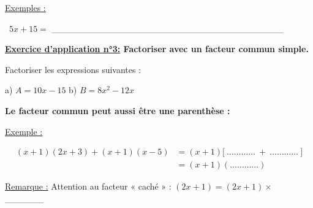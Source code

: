 \documentclass[12pt]{article}
\begin{document}
\vspace{5pt}
\underline{Exemples :}

\vspace{5pt}
\textbullet \ $5x + 15 = $ \_\_\_\_\_\_\_\_\_\_\_\_\_\_\_\_\_\_\_\_\_\_\_\_\_\_\_\_\_\_\_\_\_\_\_\_

\vspace{5pt}
\begin{mdframed}[
    linewidth=1pt,
    roundcorner=5pt,
    linecolor=RoyalBlue,
    innertopmargin=10pt,
    innerbottommargin=10pt
]
{\color{RoyalBlue}
\textbf{\underline{Exercice d'application n°3:} Factoriser avec un facteur commun simple.}}

\vspace{5pt}
Factoriser les expressions suivantes :

\vspace{5pt}
\hspace{1cm}a) $A = 10x - 15$ \hspace{3cm}b) $B = 8x^2 - 12x$

\vspace{0.5cm}
{\color{black!45}\dotfill}

\vspace{0.5cm}
{\color{black!45}\dotfill}

\vspace{0.5cm}
{\color{black!45}\dotfill}

\vspace{20pt}

\end{mdframed}

\vspace{5pt}
\textbf{Le facteur commun peut aussi être une parenthèse :}

\vspace{5pt}
\underline{Exemple :}

\vspace{-10pt}
\begin{align*}
    (x+1)(2x+3) + (x+1)(x-5) &= (x+1)\big[\ \dots\dots\dots\dots\ + \ \dots\dots\dots\dots\ \big] \\[6pt]
    &= (x+1)(\dots\dots\dots\dots)
\end{align*}

\underline{Remarque :} Attention au facteur « caché » : $(2x+1) = (2x+1) \times $ \_\_\_\_\_\_
\end{document}
